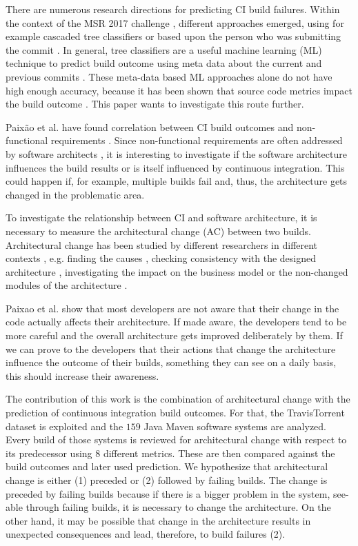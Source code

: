 \documentclass[sigplan, anonymous, review]{acmart}
\begin{document}
There are numerous research directions for predicting CI build failures. Within the context of the MSR 2017 challenge \cite{TravisTorrent}, different approaches emerged, using for example cascaded tree classifiers \cite{Pred-Cascade} or based upon the person who was submitting the commit \cite{ContrInvolv}. In general, tree classifiers are a useful machine learning (ML) technique to predict build outcome using meta data about the current and previous commits \cite{Pred-Tree}. 
These meta-data based ML approaches alone do not have high enough accuracy, because it has been shown that source code metrics impact the build outcome \cite{FailsCorr}. This paper wants to investigate this route further. 

Paix\~{a}o et al. have found correlation between CI build outcomes and non-functional requirements \cite{Fail-NFReq}. Since non-functional requirements are often addressed by software architects \cite{NFR-Architects}, it is interesting to investigate if the software architecture influences the build results or is itself influenced by continuous integration. 
This could happen if, for example, multiple builds fail and, thus, the architecture gets changed in the problematic area.

To investigate the relationship between CI and software architecture, it is necessary to measure the architectural change (AC) between two builds. Architectural change has been studied by different researchers in different contexts \cite{Aramis,StructDist,Arc-MDSE,Arcade-Base} , e.g.  finding the causes \cite{AC-Causes}, checking consistency with the designed architecture \cite{ArcConf, ArcCons}, investigating the impact on the business model \cite{ArcChange-Business} or the non-changed modules of the architecture \cite{Knowledge-AC}. 

Paixao et al. \cite{ImpactAwareness} show that most developers are not aware that their change in the code actually affects their architecture. If made aware, the developers tend to be more careful and the overall architecture gets improved deliberately by them. 
If we can prove to the developers that their actions that change the architecture influence the outcome of their builds, something they can see on a daily basis, this should increase their awareness. 

The contribution of this work is the combination of architectural change with the prediction of continuous integration build outcomes. For that, the TravisTorrent dataset is exploited and the $159$ Java Maven software systems are analyzed. Every build of those systems is reviewed for architectural change with respect to its predecessor using 8 different metrics. These are then compared against the build outcomes and later used prediction. We hypothesize that architectural change is either (1) preceded or (2) followed by failing builds. 
The change is preceded by failing builds because if there is a bigger problem in the system, see-able through failing builds, it is necessary to change the architecture. 
On the other hand, it may be possible that change in the architecture results in unexpected consequences and lead, therefore, to build failures (2).
\end{document}
